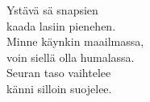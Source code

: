 
            Ystävä sä snapsien \\
            kaada lasiin pienehen. \\
            Minne käynkin maailmassa, \\
            voin siellä olla humalassa. \\
            Seuran taso vaihtelee \\
            känni silloin suojelee. \\
